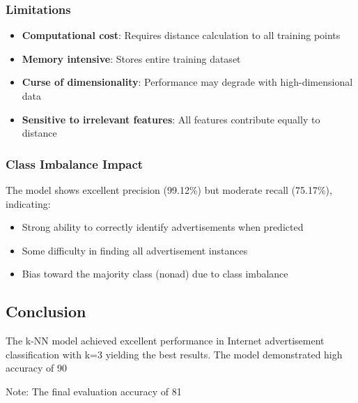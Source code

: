 \subsubsection{Limitations}
\begin{itemize}
    \item \textbf{Computational cost}: Requires distance calculation to all training points
    \item \textbf{Memory intensive}: Stores entire training dataset
    \item \textbf{Curse of dimensionality}: Performance may degrade with high-dimensional data
    \item \textbf{Sensitive to irrelevant features}: All features contribute equally to distance
\end{itemize}

\subsubsection{Class Imbalance Impact}
The model shows excellent precision (99.12\%) but moderate recall (75.17\%), indicating:
\begin{itemize}
    \item Strong ability to correctly identify advertisements when predicted
    \item Some difficulty in finding all advertisement instances
    \item Bias toward the majority class (nonad) due to class imbalance
\end{itemize}

\subsection{Conclusion}
The k-NN model achieved excellent performance in Internet advertisement classification with k=3 yielding the best results. The model demonstrated high accuracy of 90%

Note: The final evaluation accuracy of 81%